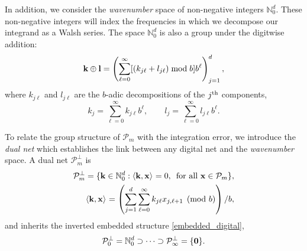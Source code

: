 In addition, we consider the \emph{wavenumber} space of non-negative integers $\mathbb{N}_0^d$. These non-negative integers will index the frequencies in which we decompose our integrand as a Walsh series. The space $\mathbb{N}_0^d$ is also a group under the digitwise addition:
\[
\boldsymbol{\mathbf{k}} \oplus \boldsymbol{\mathbf{l}} = \left(\sum_{\ell=0}^{\infty} [(k_{j\ell} + l_{j\ell}) \bmod b] b^{\ell} \right)_{j=1}^d,
\]
where $k_{j\ell}$ and $l_{j\ell}$ are the $b$-adic decompositions of the $j^{\rm th}$ components,
\[
k_{j} = \sum_{\ell=0}^{\infty} k_{j\ell}b^{\ell},\qquad l_{j} = \sum_{\ell=0}^{\infty} l_{j\ell}b^{\ell}.
\]

To relate the group structure of $\mathcal{P}_m$ with the integration error, we introduce the \emph{dual net} which establishes the link between any digital net and the \emph{wavenumber} space. A dual net $\mathcal{P}_m^\perp$ is
\begin{align*}
\mathcal{P}_m^\perp=\{\boldsymbol{\mathbf{k}}\in\mathbb{N}_0^d:\left \langle \boldsymbol{\mathbf{k}}, \boldsymbol{\mathbf{x}} \right \rangle_{{}}=0,\, \text{ for all } \boldsymbol{\mathbf{x}}\in\mathcal{P}_m\}, \\
\left \langle \boldsymbol{\mathbf{k}}, \boldsymbol{\mathbf{x}} \right \rangle_{{}} = \left(\sum_{j=1}^{d} \sum_{\ell=0}^{\infty} k_{j\ell}x_{j,\ell+1}  \pmod b \right)/b,
\end{align*}
and inherits the inverted embedded structure \eqref{embedded_digital},
\begin{equation}\label{dual_net_structure}
\mathcal{P}_0^\perp=\mathbb{N}_0^d\supset\dots\supset\mathcal{P}_\infty^\perp=\{\boldsymbol{\mathbf{0}}\}.
\end{equation}

